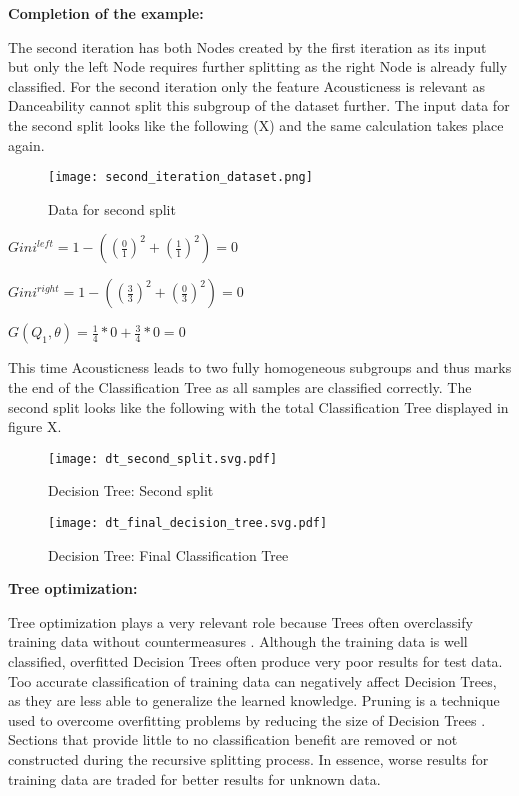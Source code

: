 \textbf{Completion of the example:}

The second iteration has both Nodes created by the first iteration as its input but only the left Node requires further splitting as 
the right Node is already fully classified. For the second iteration only the feature Acousticness is relevant as Danceability cannot 
split this subgroup of the dataset further. The input data for the second split looks like the following (X) and the same calculation 
takes place again. 

\begin{figure}[H]
    \centering
    \caption[]{Data for second split}
	\label{fig:second_iteration_dataset}
    \texttt{[image: second\_iteration\_dataset.png]}
\end{figure}

\(Gini^{left} = 1 - ((\frac{0}{1})^2 + (\frac{1}{1})^2) = 0 \)

\(Gini^{right}  = 1 - ((\frac{3}{3})^2 + (\frac{0}{3})^2) = 0 \)

\(G(Q_{1},\theta) = \frac{1}{4} * 0 + \frac{3}{4} * 0 = 0 \)

This time Acousticness leads to two fully homogeneous subgroups and thus marks the end of the Classification Tree as all samples are 
classified correctly. The second split looks like the following with the total Classification Tree displayed in figure X.

\begin{figure}[H]
    \centering
    \caption[]{Decision Tree: Second split}
	\label{fig:dt_second_split}
    \texttt{[image: dt\_second\_split.svg.pdf]}
\end{figure}

\begin{figure}[H]
    \centering
    \caption[]{Decision Tree: Final Classification Tree}
	\label{fig:dt_final_decision_tree}
    \texttt{[image: dt\_final\_decision\_tree.svg.pdf]}
\end{figure}

\textbf{Tree optimization:}

Tree optimization plays a very relevant role because Trees often overclassify training data 
without countermeasures \cite[p.7]{lewis2000introduction}. Although the training data is well classified, overfitted Decision 
Trees often produce very poor results for test data. Too accurate classification of training 
data can negatively affect Decision Trees, as they are less able to generalize the learned 
knowledge. Pruning is a technique used to overcome overfitting problems by reducing the size of 
Decision Trees \cite[p.331]{James2021}. Sections that provide little to no classification benefit are removed or not 
constructed during the recursive splitting process. In essence, worse results for training data 
are traded for better results for unknown data.

